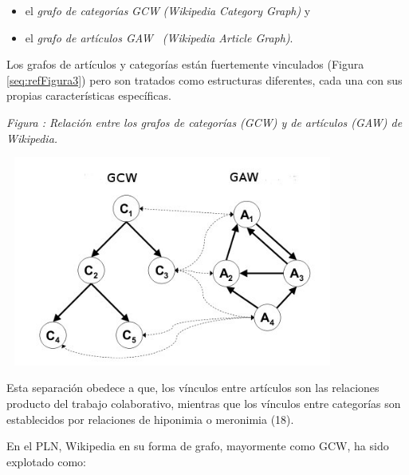 \documentclass[letterpaper]{article}
\newcommand\textstylebibuscitbase[1]{#1}
\newcommand\liststyleLvi{%
\renewcommand\labelitemi{{\textbullet}}
\renewcommand\labelitemii{${\circ}$}
\renewcommand\labelitemiii{${\blacksquare}$}
\renewcommand\labelitemiv{{\textbullet}}
}
\newcounter{Figura}
\renewcommand\theFigura{\arabic{Figura}}
\begin{document}
\liststyleLvi
\begin{itemize}
\item {\sffamily
el \textit{grafo de categor\'ias
}\foreignlanguage{spanish}{\textit{GCW}}\textit{ (Wikipedia Category
Graph)} y }
\item {\sffamily
el \textit{grafo de art\'iculos GAW \ (Wikipedia Article Graph)}.}
\end{itemize}

\bigskip

{\sffamily
Los grafos de art\'iculos y categor\'ias est\'an fuertemente vinculados
(Figura \ref{seq:refFigura3}) pero son tratados como estructuras
diferentes, cada una con sus propias caracter\'isticas espec\'ificas.}


\bigskip



\begin{center}
\begin{minipage}{11.015cm}
{\centering{}\itshape
Figura {\theFigura\label{seq:refFigura3}}:
Relaci\'on entre los grafos de categor\'ias (GCW) y de art\'iculos
(GAW) de Wikipedia.
\par}
\includegraphics[width=11.015cm,height=6.899cm]{Capitulo2-img7.jpg}\end{minipage}
\end{center}
{\sffamily
Esta separaci\'on obedece a que, los v\'inculos entre art\'iculos son
las relaciones producto del trabajo colaborativo, mientras que los
v\'inculos entre categor\'ias son establecidos por relaciones de
hiponimia o meronimia\textstylebibuscitbase{
}\textstylebibuscitbase{(18)}. }


\bigskip

{\sffamily
En el PLN, Wikipedia en su forma de grafo, mayormente como GCW, ha sido
explotado como:}
\end{document}
